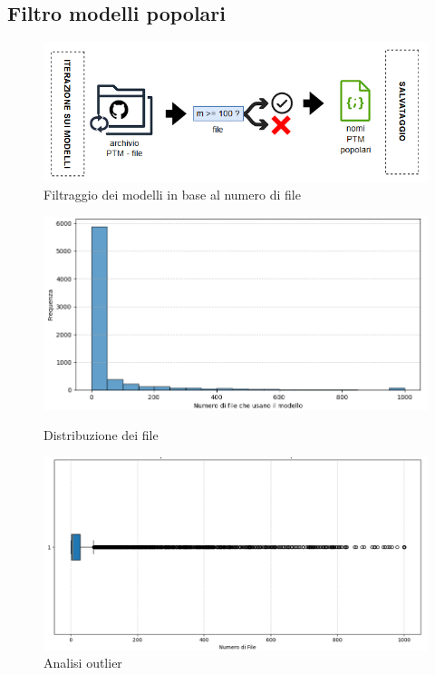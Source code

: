 \documentclass{article}
\begin{document}
\subsection{Filtro modelli popolari}
\begin{figure}[htbp]
    \centering
    \includegraphics[width=\linewidth]{images/approccio_filtro_popolarita.png}
    \caption{Filtraggio dei modelli in base al numero di file}
    \label{fig:filtro_popolarita}
\end{figure}
\begin{figure}[h]
    \centering
    \begin{minipage}{0.45\textwidth}
        \centering
        \includegraphics[width=\linewidth]{images/approccio1.png}
        \caption{Distribuzione dei file}
        \label{fig:distribuzione_file1}
    \end{minipage}
    \hfill
    \begin{minipage}{0.45\textwidth}
        \centering
        \includegraphics[width=\linewidth]{images/approccio2.png}
        \caption{Analisi outlier}
        \label{fig:outlier_file1}
    \end{minipage}
\end{figure}
\end{document}
